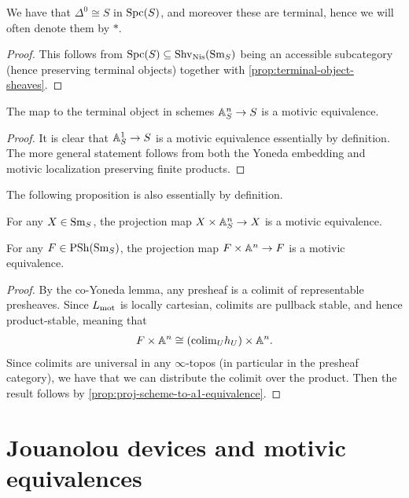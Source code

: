 \documentclass[11pt,openany]{book}
\renewcommand{\Pre}{\mathrm{PSh}}
\begin{document}
\begin{proposition}\label{prop:terminal-object-motivic-spaces} 
We have that $\Delta^0 \cong S$ in $\mathrm{Spc}(S)$, and moreover these are terminal, hence we will often denote them by $\ast$.
\end{proposition}
\begin{proof} This follows from $\mathrm{Spc}(S) \subseteq \mathrm{Shv}_{\mathrm{Nis}}(\mathrm{Sm}_S)$ being an accessible subcategory (hence preserving terminal objects) together with \autoref{prop:terminal-object-sheaves}.
\end{proof}

\begin{proposition} The map to the terminal object in schemes $\mathbb{A}^n_S \to S$ is a motivic equivalence.
\end{proposition}
\begin{proof} It is clear that $\mathbb{A}^1_S \to S$ is a motivic equivalence essentially by definition. The more general statement follows from both the Yoneda embedding and motivic localization preserving finite products.
\end{proof}

The following proposition is also essentially by definition.

\begin{proposition}\label{prop:proj-scheme-to-a1-equivalence} 
For any $X\in \mathrm{Sm}_S$, the projection map $X \times \mathbb{A}^n_S \to X$ is a motivic equivalence.
\end{proposition}

\begin{proposition} For any $F\in \Pre(\Sm_S)$, the projection map $F \times \mathbb{A}^n \to F$ is a motivic equivalence.
\end{proposition}
\begin{proof} By the co-Yoneda lemma, any presheaf is a colimit of representable presheaves. Since $L_{\mathrm{mot}}$ is locally cartesian, colimits are pullback stable, and hence product-stable, meaning that
\begin{align*}
    F \times \mathbb{A}^n \cong \left(\mathrm{colim}_U h_U\right) \times \mathbb{A}^n.
\end{align*}
Since colimits are universal in any $\infty$-topos (in particular in the presheaf category), we have that we can distribute the colimit over the product. Then the result follows by \autoref{prop:proj-scheme-to-a1-equivalence}.
\end{proof}


\section{Jouanolou devices and motivic equivalences}
\end{document}
